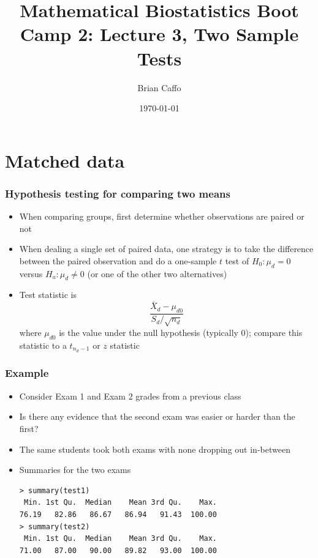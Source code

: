 \documentclass[aspectratio=169]{beamer}
\title{Mathematical Biostatistics Boot Camp 2: Lecture 3, Two Sample Tests}
\author{Brian Caffo}
\date{\today}
\institute[Department of Biostatistics]{
  Department of Biostatistics \\
  Johns Hopkins Bloomberg School of Public Health\\
  Johns Hopkins University
}
\begin{document}
\frame{\titlepage}


\section{Matched data}
\begin{frame}\frametitle{Hypothesis testing for comparing two means}
\begin{itemize}
\item When comparing groups, first determine whether observations are
  paired or not
\item When dealing a single set of paired data, one strategy is to
  take the difference between the paired observation and do a
  one-sample $t$ test of $H_0:\mu_d = 0$ versus $H_a:\mu_d \neq 0$ (or
  one of the other two alternatives)
\item Test statistic is
  $$
  \frac{\bar X_d - \mu_{d0}}{S_d / \sqrt{n_d}}
  $$
  where $\mu_{d0}$ is the value under the null hypothesis (typically
  $0$); compare this statistic to a $t_{n_d -1}$ or $z$ statistic
\end{itemize}
\end{frame}

\begin{frame}[fragile]\frametitle{Example}
  \begin{itemize}
    \item Consider Exam 1 and Exam 2 grades from a previous class
    \item Is there any evidence that the second exam was easier or
      harder than the first?
    \item The same students took both exams with none dropping out in-between
    \item Summaries for the two exams
\begin{verbatim}
> summary(test1)
 Min. 1st Qu.  Median    Mean 3rd Qu.    Max.    
76.19   82.86   86.67   86.94   91.43  100.00     
> summary(test2)                
 Min. 1st Qu.  Median    Mean 3rd Qu.    Max.     
71.00   87.00   90.00   89.82   93.00  100.00    
\end{verbatim}
  \end{itemize}
\end{frame}
\end{document}

